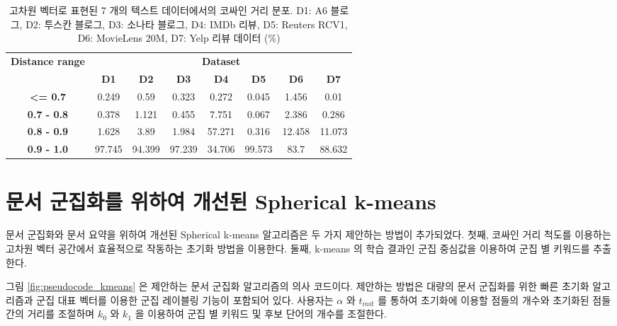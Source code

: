 \documentclass[oneside, ko,phd]{snuthesis_utf8_kor}
\begin{document}
\begin{table}[H]
\caption{고차원 벡터로 표현된 7 개의 텍스트 데이터에서의 코싸인 거리 분포. D1: A6 블로그, D2: 투스칸 블로그, D3: 소나타 블로그, D4: IMDb 리뷰, D5: Reuters RCV1, D6: MovieLens 20M, D7: Yelp 리뷰 데이터 (\%)}
\label{tab:cosine_distance_distribution}
\centering
\begin{tabular}{|c|c|c|c|c|c|c|c|}
\hline
\multirow{2}{*}{\textbf{Distance range}} & \multicolumn{7}{c|}{\textbf{Dataset}} \\ \cline{2-8} 
 & \textbf{D1} & \textbf{D2} & \textbf{D3} & \textbf{D4} & \textbf{D5} & \textbf{D6} & \textbf{D7} \\ \hline
\textbf{\textless{}= 0.7} & 0.249 & 0.59 & 0.323 & 0.272 & 0.045 & 1.456 & 0.01 \\ \hline
\textbf{0.7 - 0.8} & 0.378 & 1.121 & 0.455 & 7.751 & 0.067 & 2.386 & 0.286 \\ \hline
\textbf{0.8 - 0.9} & 1.628 & 3.89 & 1.984 & 57.271 & 0.316 & 12.458 & 11.073 \\ \hline
\textbf{0.9 - 1.0} & 97.745 & 94.399 & 97.239 & 34.706 & 99.573 & 83.7 & 88.632 \\ \hline
\end{tabular}
\end{table}

\section{문서 군집화를 위하여 개선된 Spherical k-means}

문서 군집화와 문서 요약을 위하여 개선된 Spherical k-means 알고리즘은 두 가지 제안하는 방법이 추가되었다.
첫째, 코싸인 거리 척도를 이용하는 고차원 벡터 공간에서 효율적으로 작동하는 초기화 방법을 이용한다.
둘째, k-means 의 학습 결과인 군집 중심값을 이용하여 군집 별 키워드를 추출한다.

그림 \ref{fig:pseudocode_kmeans} 은 제안하는 문서 군집화 알고리즘의 의사 코드이다.
제안하는 방법은 대량의 문서 군집화를 위한 빠른 초기화 알고리즘과 군집 대표 벡터를 이용한 군집 레이블링 기능이 포함되어 있다.
사용자는 $\alpha$ 와 $t_{init}$ 를 통하여 초기화에 이용할 점들의 개수와 초기화된 점들 간의 거리를 조절하며 $k_0$ 와 $k_1$ 을 이용하여 군집 별 키워드 및 후보 단어의 개수를 조절한다.
\end{document}
